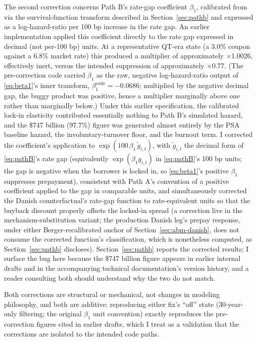 \documentclass[12pt]{article}
\begin{document}
The second correction concerns Path B's rate-gap coefficient $\beta_1$, calibrated from \citet{liebersohn2024} via the survival-function transform described in Section~\ref{sec:pathb} and expressed as a log-hazard-ratio per 100 bp increase in the rate gap. An earlier implementation applied this coefficient directly to the rate gap expressed in decimal (not per-100 bp) units. At a representative QT-era state (a 3.0\% coupon against a 6.8\% market rate) this produced a multiplier of approximately $\times$1.0026, effectively inert, versus the intended suppression of approximately $\times$0.77. (The pre-correction code carried $\beta_1$ as the raw, negative log-hazard-ratio output of \eqref{eq:beta1}'s inner transform, $\beta_1^{\mathrm{code}} = -0.0686$; multiplied by the negative decimal gap, the buggy product was positive, hence a multiplier marginally above one rather than marginally below.) Under this earlier specification, the calibrated lock-in elasticity contributed essentially nothing to Path B's simulated hazard, and the \$747 billion (97.7\%) figure was generated almost entirely by the PSA baseline hazard, the involuntary-turnover floor, and the burnout term. I corrected the coefficient's application to $\exp(100\,\beta_1\,\tilde g_{i,t})$, with $\tilde g_{i,t}$ the decimal form of \eqref{eq:pathB}'s rate gap (equivalently $\exp(\beta_1 g_{i,t})$ in \eqref{eq:pathB}'s 100 bp units; the gap is negative when the borrower is locked in, so \eqref{eq:beta1}'s positive $\beta_1$ suppresses prepayment), consistent with Path A's convention of a positive coefficient applied to the gap in comparable units, and simultaneously corrected the Danish counterfactual's rate-gap function to rate-equivalent units so that the buyback discount properly offsets the locked-in spread (a correction live in the mechanism-substitution variant; the production Danish leg's prepay response, under either Berger-recalibrated anchor of Section~\ref{sec:abm-danish}, does not consume the corrected function's classification, which is nonetheless computed, as Section~\ref{sec:pathb} discloses). Section~\ref{sec:pathb} reports the corrected results; I surface the bug here because the \$747 billion figure appears in earlier internal drafts and in the accompanying technical documentation's version history, and a reader consulting both should understand why the two do not match.

Both corrections are structural or mechanical, not changes in modeling philosophy, and both are additive: reproducing either fix's ``off'' state (30-year-only filtering; the original $\beta_1$ unit convention) exactly reproduces the pre-correction figures cited in earlier drafts, which I treat as a validation that the corrections are isolated to the intended code paths.
\end{document}
